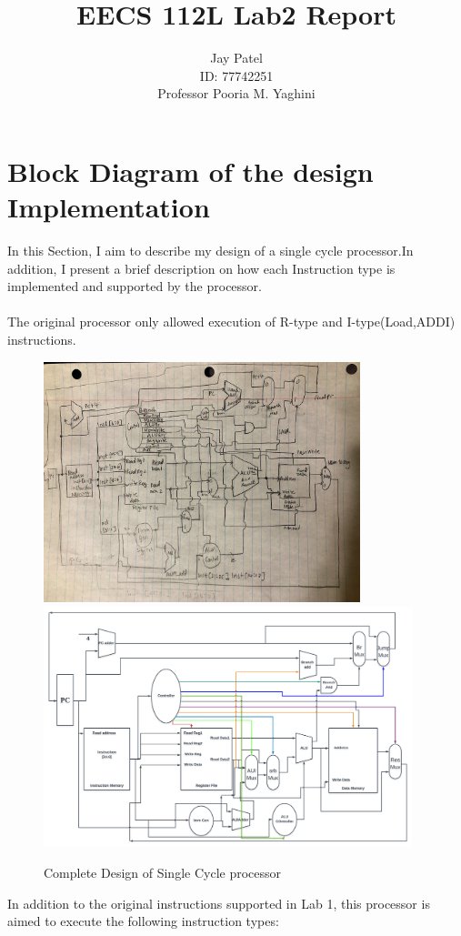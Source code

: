\documentclass[20pt]{article}
\title{EECS 112L Lab2 Report}
\author{Jay Patel\\ \vspace{0.5cm} ID: 77742251\\ Professor Pooria M. Yaghini}
\begin{document}
\maketitle
{}
\newpage
\section{Block Diagram of the design Implementation}

In this Section, I aim to describe my design of a single cycle processor.In addition, I present a brief description on how each Instruction type is implemented and supported by the processor. \\\\
The original processor only allowed execution of R-type and I-type(Load,ADDI) instructions.

\begin{figure}[H]
\includegraphics[width=\linewidth,height=7cm]{design.jpg}
\includegraphics[width=\linewidth,height=7cm]{Datapath}
\caption{Complete Design of Single Cycle processor}
\end{figure}
In addition to the original instructions supported in Lab 1, this processor is aimed to execute the following instruction types:
\end{document}
